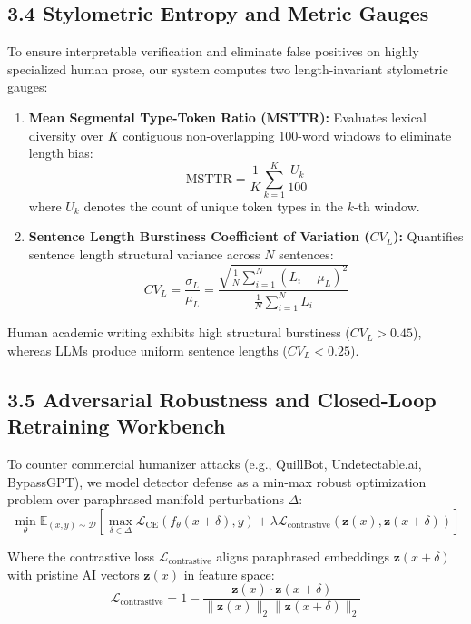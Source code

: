 \documentclass[conference]{IEEEtran}
\begin{document}
\subsection{3.4 Stylometric Entropy and Metric Gauges}
To ensure interpretable verification and eliminate false positives on highly specialized human prose, our system computes two length-invariant stylometric gauges:
\begin{enumerate}
    \item \textbf{Mean Segmental Type-Token Ratio (MSTTR):} Evaluates lexical diversity over $K$ contiguous non-overlapping 100-word windows to eliminate length bias:
    \begin{equation}
        \text{MSTTR} = \frac{1}{K} \sum_{k=1}^{K} \frac{U_k}{100}
    \end{equation}
    where $U_k$ denotes the count of unique token types in the $k$-th window.

    \item \textbf{Sentence Length Burstiness Coefficient of Variation ($CV_L$):} Quantifies sentence length structural variance across $N$ sentences:
    \begin{equation}
        CV_L = \frac{\sigma_L}{\mu_L} = \frac{\sqrt{\frac{1}{N}\sum_{i=1}^N (L_i - \mu_L)^2}}{\frac{1}{N}\sum_{i=1}^N L_i}
    \end{equation}
\end{enumerate}
Human academic writing exhibits high structural burstiness ($CV_L > 0.45$), whereas LLMs produce uniform sentence lengths ($CV_L < 0.25$).

\subsection{3.5 Adversarial Robustness and Closed-Loop Retraining Workbench}
To counter commercial humanizer attacks (e.g., QuillBot, Undetectable.ai, BypassGPT), we model detector defense as a min-max robust optimization problem over paraphrased manifold perturbations $\Delta$:
\begin{equation}
    \min_{\theta} \mathbb{E}_{(x,y) \sim \mathcal{D}} \left[ \max_{\delta \in \Delta} \mathcal{L}_{\text{CE}}\left( f_{\theta}(x + \delta), y \right) + \lambda \mathcal{L}_{\text{contrastive}}\left( \mathbf{z}(x), \mathbf{z}(x + \delta) \right) \right]
\end{equation}

Where the contrastive loss $\mathcal{L}_{\text{contrastive}}$ aligns paraphrased embeddings $\mathbf{z}(x + \delta)$ with pristine AI vectors $\mathbf{z}(x)$ in feature space:
\begin{equation}
    \mathcal{L}_{\text{contrastive}} = 1 - \frac{\mathbf{z}(x) \cdot \mathbf{z}(x + \delta)}{\|\mathbf{z}(x)\|_2 \|\mathbf{z}(x + \delta)\|_2}
\end{equation}
\end{document}
